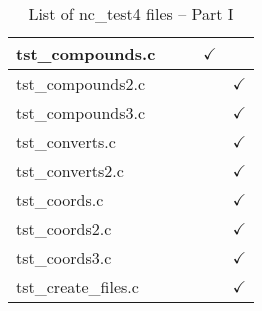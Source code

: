 \begin{table}[H]
\begin{tabular}{|l|c|c|c|c|}
tst\_compounds.c   &  &   &  $\checkmark$ &    \\ \hline
tst\_compounds2.c   &  &   &   & $\checkmark$    \\ \hline
tst\_compounds3.c   &  &   &   & $\checkmark$    \\ \hline
tst\_converts.c   &  &   &   & $\checkmark$    \\ \hline
tst\_converts2.c   &  &   &   & $\checkmark$    \\ \hline
tst\_coords.c   &  &   &   & $\checkmark$    \\ \hline
tst\_coords2.c   &  &   &   & $\checkmark$    \\ \hline
tst\_coords3.c   &  &   &   & $\checkmark$    \\ \hline
tst\_create\_files.c   &  &   &   & $\checkmark$    \\ \hline
\hline
\end{tabular}
\caption{List of nc\_test4 files -- Part I}
\end{table}


